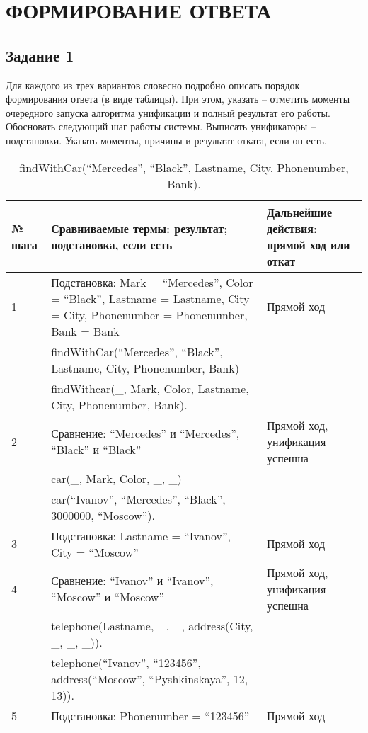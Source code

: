 \section{ФОРМИРОВАНИЕ ОТВЕТА}

\subsection{Задание 1}

Для каждого из трех вариантов словесно подробно описать порядок формирования ответа (в виде таблицы). При этом, указать – отметить моменты очередного запуска алгоритма унификации и полный результат его работы. Обосновать следующий шаг работы системы. Выписать унификаторы – подстановки. Указать моменты, причины и результат отката, если он есть.

{
\small
\begin{longtable}{|p{1.15cm}|p{8cm}|p{8cm}|}
    \caption{findWithCar(``Mercedes'', ``Black'', Lastname, City, Phonenumber, Bank).} \\
    \hline
    № шага & Сравниваемые термы: результат; подстановка, если есть & Дальнейшие действия: прямой ход или откат \\
    \hline
    1 & Подстановка: Mark = ``Mercedes'', Color = ``Black'', Lastname = Lastname, City = City, Phonenumber = Phonenumber, Bank = Bank & Прямой ход \\
      & findWithCar(``Mercedes'', ``Black'', Lastname, City, Phonenumber, Bank) & \\
      & findWithcar(\_, Mark, Color, Lastname, City, Phonenumber, Bank). & \\
    \hline
    2 & Сравнение: ``Mercedes'' и ``Mercedes'', ``Black'' и ``Black'' & Прямой ход, унификация успешна \\
      & car(\_, Mark, Color, \_, \_) & \\
      & car(``Ivanov'', ``Mercedes'', ``Black'', 3000000, ``Moscow''). & \\
    \hline
    3 & Подстановка: Lastname = ``Ivanov'', City = ``Moscow'' & Прямой ход \\
    \hline
    4 & Сравнение: ``Ivanov'' и ``Ivanov'', ``Moscow'' и ``Moscow'' & Прямой ход, унификация успешна \\
      & telephone(Lastname, \_, \_, address(City, \_, \_, \_)). & \\
      & telephone(``Ivanov'', ``123456'', address(``Moscow'', ``Pyshkinskaya'', 12, 13)). & \\
    \hline
    5 & Подстановка: Phonenumber = ``123456'' & Прямой ход \\

\end{longtable}}
